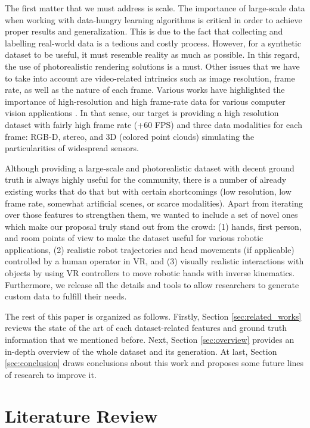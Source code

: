 The first matter that we must address is scale. The importance of large-scale data when working with data-hungry learning algorithms is critical in order to achieve proper results and generalization. This is due to the fact that collecting and labelling real-world data is a tedious and costly process. However, for a synthetic dataset to be useful, it must resemble reality as much as possible. In this regard, the use of photorealistic rendering solutions is a must. Other issues that we have to take into account are video-related intrinsics such as image resolution, frame rate, as well as the nature of each frame. Various works have highlighted the importance of high-resolution and high frame-rate data for various computer vision applications \cite{Handa2012}\cite{Held2016}. In that sense, our target is providing a high resolution dataset with fairly high frame rate (+60 FPS) and three data modalities for each frame: RGB-D, stereo, and 3D (colored point clouds) simulating the particularities of widespread sensors.

Although providing a large-scale and photorealistic dataset with decent ground truth is always highly useful for the community, there is a number of already existing works that do that but with certain shortcomings (low resolution, low frame rate, somewhat artificial scenes, or scarce modalities). Apart from iterating over those features to strengthen them, we wanted to include a set of novel ones which make our proposal truly stand out from the crowd: (1) hands, first person, and room points of view to make the dataset useful for various robotic applications, (2) realistic robot trajectories and head movements (if applicable) controlled by a human operator in \ac{VR}, and (3) visually realistic interactions with objects by using \ac{VR} controllers to move robotic hands with inverse kinematics. Furthermore, we release all the details and tools to allow researchers to generate custom data to fulfill their needs.

The rest of this paper is organized as follows. Firstly, Section \ref{sec:related_works} reviews the state of the art of each dataset-related features and ground truth information that we mentioned before. Next, Section \ref{sec:overview} provides an in-depth overview of the whole dataset and its generation. At last, Section \ref{sec:conclusion} draws conclusions about this work and proposes some future lines of research to improve it.

\section{Literature Review}

